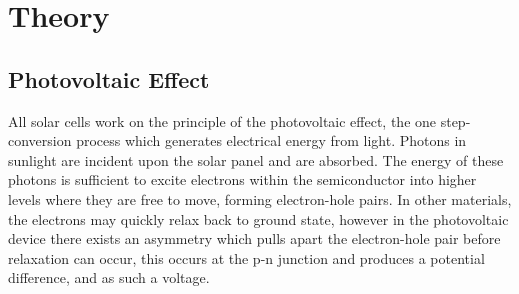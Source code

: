\documentclass[11pt,a4paper,twoside]{article}
\begin{document}








\section{Theory}




\subsection{Photovoltaic Effect}

All solar cells work on the principle of the photovoltaic effect, the one step-conversion process which generates electrical energy from light. Photons in sunlight are incident upon the solar panel and are absorbed. The energy of these photons is sufficient to excite electrons within the semiconductor into higher levels where they are free to move, forming electron-hole pairs. In other materials, the electrons may quickly  relax back to ground state, however in the photovoltaic device there exists an asymmetry which pulls apart the electron-hole pair before relaxation can occur, this occurs at the p-n junction and produces a potential difference, and as such a voltage.
\end{document}
